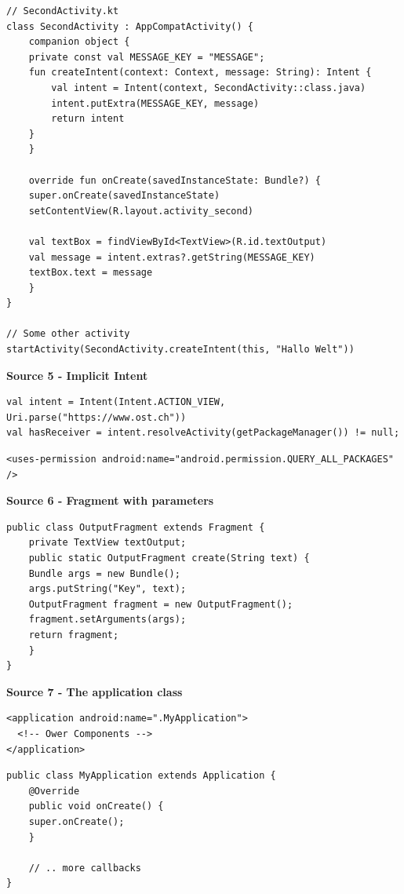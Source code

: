 \documentclass[11pt,twoside,landscape]{article}
\begin{document}
\lstset{language=kotlin,label= ,caption= ,captionpos=b,numbers=none}
\begin{lstlisting}
// SecondActivity.kt
class SecondActivity : AppCompatActivity() {
    companion object {
	private const val MESSAGE_KEY = "MESSAGE";
	fun createIntent(context: Context, message: String): Intent {
	    val intent = Intent(context, SecondActivity::class.java)
	    intent.putExtra(MESSAGE_KEY, message)
	    return intent
	}
    }

    override fun onCreate(savedInstanceState: Bundle?) {
	super.onCreate(savedInstanceState)
	setContentView(R.layout.activity_second)

	val textBox = findViewById<TextView>(R.id.textOutput)
	val message = intent.extras?.getString(MESSAGE_KEY)
	textBox.text = message
    }
}

// Some other activity
startActivity(SecondActivity.createIntent(this, "Hallo Welt"))
\end{lstlisting}

\textbf{Source 5 - Implicit Intent}

\lstset{language=java,label= ,caption= ,captionpos=b,numbers=none}
\begin{lstlisting}
val intent = Intent(Intent.ACTION_VIEW, Uri.parse("https://www.ost.ch"))
val hasReceiver = intent.resolveActivity(getPackageManager()) != null;
\end{lstlisting}

\lstset{language=XML,label= ,caption= ,captionpos=b,numbers=none}
\begin{lstlisting}
<uses-permission android:name="android.permission.QUERY_ALL_PACKAGES" />
\end{lstlisting}

\textbf{Source 6 - Fragment with parameters}

\lstset{language=java,label= ,caption= ,captionpos=b,numbers=none}
\begin{lstlisting}
public class OutputFragment extends Fragment {
    private TextView textOutput;
    public static OutputFragment create(String text) {
	Bundle args = new Bundle();
	args.putString("Key", text);
	OutputFragment fragment = new OutputFragment();
	fragment.setArguments(args);
	return fragment;
    }
}
\end{lstlisting}

\textbf{Source 7 - The application class}

\lstset{language=XML,label= ,caption= ,captionpos=b,numbers=none}
\begin{lstlisting}
<application android:name=".MyApplication">
  <!-- Ower Components -->
</application>
\end{lstlisting}

\lstset{language=java,label= ,caption= ,captionpos=b,numbers=none}
\begin{lstlisting}
public class MyApplication extends Application {
    @Override
    public void onCreate() {
	super.onCreate();
    }

    // .. more callbacks
}
\end{lstlisting}
\end{document}
